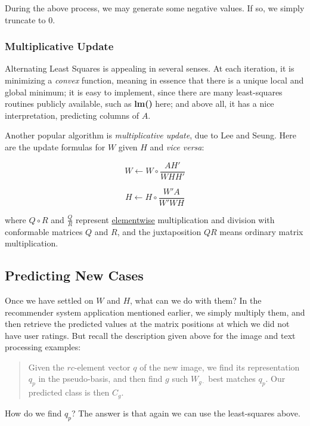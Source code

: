 During the above process, we may generate some negative values.  If so,
we simply truncate to 0.

\subsubsection{Multiplicative Update}

Alternating Least Squares is appealing in several senses.  At each
iteration, it is minimizing a {\it convex} function, meaning in essence
that there is a unique local and global minimum; it is easy to
implement, since there are many least-squares routines publicly
available, such as {\bf lm()} here; and above all, it has a nice
interpretation, predicting columns of $A$.

Another popular algorithm is {\it multiplicative update}, due to Lee and
Seung.  Here are the update formulas for $W$ given $H$ and {\it vice
versa}:

\begin{equation}
W \leftarrow W \circ 
\frac
{AH'}
{WHH'}
\end{equation}

\begin{equation}
H \leftarrow H \circ 
\frac
{W'A}
{W'WH}
\end{equation}

where $Q \circ R$ and $\frac{Q}{R}$ represent \underline{elementwise}
multiplication and division with conformable matrices $Q$ and $R$, and
the juxtaposition $QR$ means ordinary matrix multiplication.

\subsection{Predicting New Cases}

Once we have settled on $W$ and $H$, what can we do with them?  In the
recommender system application mentioned earlier, we simply multiply
them, and then retrieve the predicted values at the matrix positions at
which we did not have user ratings.  But recall the description given
above for the image and text processing examples: 

\begin{quote}
Given the $rc$-element vector $q$ of the new image, we find
its representation $q_p$ in the pseudo-basis, and then find $g$ such
$W_{g \cdot}$ best matches $q_p$.  Our predicted class is then $C_g$.
\end{quote}

How do we find $q_p$?  The answer is that again we can use the
least-squares above.

